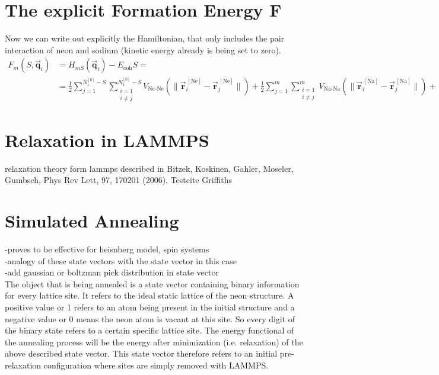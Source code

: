 \section{The explicit Formation Energy F}
Now we can write out explicitly the Hamiltonian, that only includes the pair interaction of neon and sodium (kinetic energy already is being set to zero).\begin{align}
	F_m(S,\vec{\mathbf{q}}_{i}) &= H_{mS}(\vec{\mathbf{q}}_{i}) - E_{\text{coh}} S=\\
	&=\frac{1}{2}\sum_{j=1}^{N_1^{[0]}-S}\sum_{\substack{i=1\\i\neq j}}^{N_1^{[0]}-S} V_{\text{Ne-Ne}}(\|\vec{\mathbf{r}}_i^{\,[\text{Ne}]}-\vec{\mathbf{r}}_j^{\,[\text{Ne}]}\|)+
	\frac{1}{2}\sum_{j=1}^{m}\sum_{\substack{i=1\\i\neq j}}^{m} V_{\text{Na-Na}}(\|\vec{\mathbf{r}}_i^{\,[\text{Na}]}-\vec{\mathbf{r}}_j^{\,[\text{Na}]}\|)+
\end{align}
\section{Relaxation in LAMMPS}
relaxation theory form lammps 
described in \cite{Bitzek2006} Bitzek, Koskinen, Gahler, Moseler, Gumbsch, Phys Rev Lett, 97, 170201 (2006).
Testcite Griffiths\cite{griffithsQM}
 
\section{Simulated Annealing}
-proves to be effective for heisnberg model, spin systems\\
-analogy of these state vectors with the state vector in this case\\
-add gaussian or boltzman pick distribution in state vector\\
The object that is being annealed is a state vector containing binary information for every lattice site. It refers to the ideal static lattice of the neon structure. A positive value or 1 refers to an atom being present in the initial structure and a negative value or 0 means the neon atom is vacant at this site. So every digit of the binary state refers to a certain specific lattice site. The energy functional of the annealing process will be the energy after minimization (i.e. relaxation) of the above described state vector. This state vector therefore refers to an initial pre-relaxation configuration where sites are simply removed with \ac{LAMMPS}.

